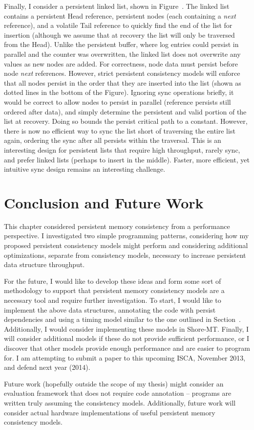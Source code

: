 Finally, I consider a persistent linked list, shown in Figure~.
The linked list contains a persistent Head reference, persistent nodes (each containing a \emph{next} reference), and a volatile Tail reference to quickly find the end of the list for insertion (although we assume that at recovery the list will only be traversed from the Head).
Unlike the persistent buffer, where log entries could persist in parallel and the counter was overwritten, the linked list does not overwrite any values as new nodes are added.
For correctness, node data must persist before node \emph{next} references.
However, strict persistent consistency models will enforce that all nodes persist in the order that they are inserted into the list (shown as dotted lines in the bottom of the Figure).
Ignoring sync operations briefly, it would be correct to allow nodes to persist in parallel (reference persists still ordered after data), and simply determine the persistent and valid portion of the list at recovery.
Doing so bounds the persist critical path to a constant.
However, there is now no efficient way to sync the list short of traversing the entire list again, ordering the sync after all persists within the traversal.
This is an interesting design for persistent lists that require high throughput, rarely sync, and prefer linked lists (perhaps to insert in the middle).
Faster, more efficient, yet intuitive sync design remains an interesting challenge.

\section{Conclusion and Future Work}
\label{sec:PMC_patterns:Conclusion}

This chapter considered persistent memory consistency from a performance perspective.
I investigated two simple programming patterns, considering how my proposed persistent consistency models might perform and considering additional optimizations, separate from consistency models, necessary to increase persistent data structure throughput.

For the future, I would like to develop these ideas and form some sort of methodology to support that persistent memory consistency models are a necessary tool and require further investigation.
To start, I would like to implement the above data structures, annotating the code with persist dependencies and using a timing model similar to the one outlined in Section~.
Additionally, I would consider implementing these models in Shore-MT.
Finally, I will consider additional models if these do not provide sufficient performance, or I discover that other models provide enough performance and are easier to program for.
I am attempting to submit a paper to this upcoming ISCA, November 2013, and defend next year (2014).

Future work (hopefully outside the scope of my thesis) might consider an evaluation framework that does not require code annotation -- programs are written truly assuming the consistency models.
Additionally, future work will consider actual hardware implementations of useful persistent memory consistency models.
